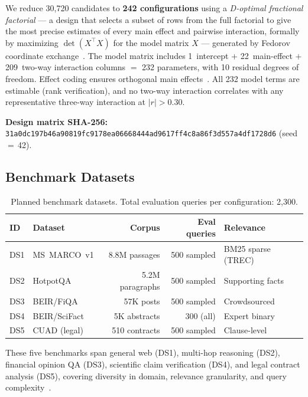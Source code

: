 \documentclass[11pt]{article}
\begin{document}
We reduce 30{,}720 candidates to \textbf{242 configurations} using a
\emph{D-optimal fractional factorial} --- a design that selects a
subset of rows from the full factorial to give the most precise
estimates of every main effect and pairwise interaction, formally by
maximizing $\det(X^{\top} X)$ for the model matrix $X$ --- generated
by Fedorov coordinate
exchange~\citep{fedorov1972theory,atkinson2007optimum}.  The model
matrix includes 1~intercept $+$ 22~main-effect $+$ 209~two-way
interaction columns $=$ 232 parameters, with 10 residual degrees of
freedom.  Effect coding ensures orthogonal main
effects~\citep{box2005statistics,montgomery2017design}.  All 232 model
terms are estimable (rank verification), and no two-way interaction
correlates with any representative three-way interaction at
$|r| > 0.30$.

\textbf{Design matrix SHA-256:}
\texttt{31a0dc197b46a90819fc9178ea06668444ad9617ff4c8a86f3d557a4df1728d6}
(seed\,$=$\,42).

\subsection{Benchmark Datasets}

\begin{table}[h]
\centering
\footnotesize
\caption{Planned benchmark datasets.  Total evaluation queries per
  configuration: 2{,}300.}
\label{tab:benchmarks}
\begin{tabular}{@{}llrrl@{}}
\toprule
ID & Dataset & Corpus & Eval queries & Relevance \\
\midrule
DS1 & MS~MARCO~v1     & 8.8M passages       & 500 sampled & BM25 sparse (TREC) \\
DS2 & HotpotQA        & 5.2M paragraphs      & 500 sampled & Supporting facts \\
DS3 & BEIR/FiQA       & 57K posts            & 500 sampled & Crowdsourced \\
DS4 & BEIR/SciFact    & 5K abstracts         & 300 (all)   & Expert binary \\
DS5 & CUAD (legal)    & 510 contracts        & 500 sampled & Clause-level \\
\bottomrule
\end{tabular}
\end{table}

These five benchmarks span general web (DS1), multi-hop reasoning
(DS2), financial opinion QA (DS3), scientific claim verification
(DS4), and legal contract analysis (DS5), covering diversity in domain,
relevance granularity, and query
complexity~\citep{thakur2021beir}.
\end{document}
